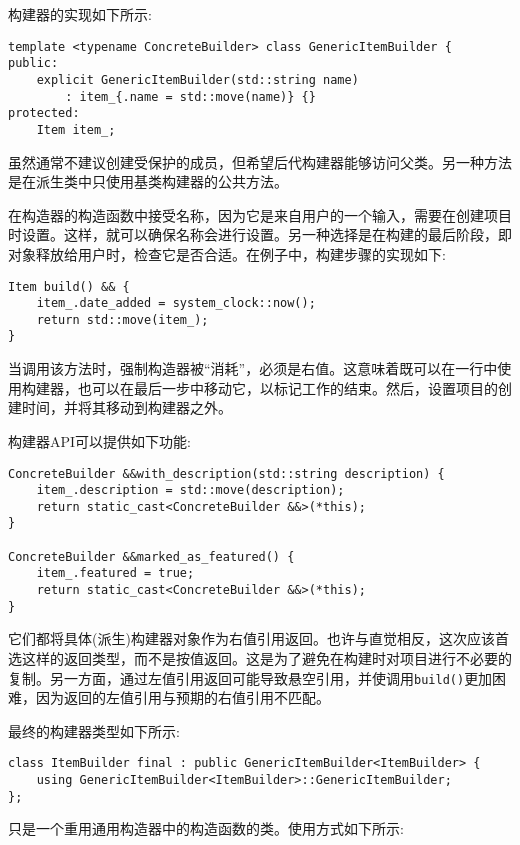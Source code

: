 构建器的实现如下所示:

\begin{lstlisting}[style=styleCXX]
template <typename ConcreteBuilder> class GenericItemBuilder {
public:
	explicit GenericItemBuilder(std::string name)
		: item_{.name = std::move(name)} {}
protected:
	Item item_;
\end{lstlisting}

虽然通常不建议创建受保护的成员，但希望后代构建器能够访问父类。另一种方法是在派生类中只使用基类构建器的公共方法。

在构造器的构造函数中接受名称，因为它是来自用户的一个输入，需要在创建项目时设置。这样，就可以确保名称会进行设置。另一种选择是在构建的最后阶段，即对象释放给用户时，检查它是否合适。在例子中，构建步骤的实现如下:

\begin{lstlisting}[style=styleCXX]
Item build() && {
	item_.date_added = system_clock::now();
	return std::move(item_);
}
\end{lstlisting}

当调用该方法时，强制构造器被“消耗”，必须是右值。这意味着既可以在一行中使用构建器，也可以在最后一步中移动它，以标记工作的结束。然后，设置项目的创建时间，并将其移动到构建器之外。

构建器API可以提供如下功能:

\begin{lstlisting}[style=styleCXX]
ConcreteBuilder &&with_description(std::string description) {
	item_.description = std::move(description);
	return static_cast<ConcreteBuilder &&>(*this);
}

ConcreteBuilder &&marked_as_featured() {
	item_.featured = true;
	return static_cast<ConcreteBuilder &&>(*this);
}
\end{lstlisting}

它们都将具体(派生)构建器对象作为右值引用返回。也许与直觉相反，这次应该首选这样的返回类型，而不是按值返回。这是为了避免在构建时对项目进行不必要的复制。另一方面，通过左值引用返回可能导致悬空引用，并使调用\texttt{build()}更加困难，因为返回的左值引用与预期的右值引用不匹配。

最终的构建器类型如下所示:

\begin{lstlisting}[style=styleCXX]
class ItemBuilder final : public GenericItemBuilder<ItemBuilder> {
	using GenericItemBuilder<ItemBuilder>::GenericItemBuilder;
};
\end{lstlisting}

只是一个重用通用构造器中的构造函数的类。使用方式如下所示:

